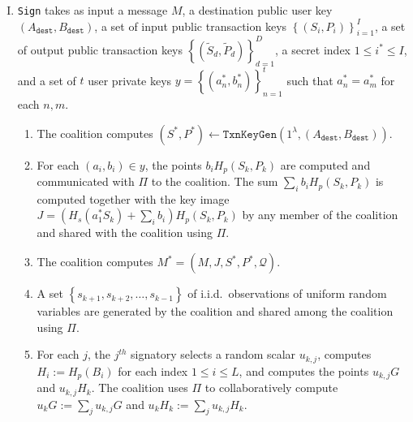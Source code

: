 \documentclass{mrl}
\theoremstyle{definition}
\begin{document}
\begin{enumerate}[(I)]

\item \texttt{Sign} takes as input a message $M$, a destination public user key $(A_{\texttt{dest}}, B_{\texttt{dest}})$, a set of input public transaction keys $\left\{(S_i, P_i)\right\}_{i=1}^{I}$, a set of output public transaction keys $\left\{(\widetilde{S}_d, \widetilde{P}_d)\right\}_{d=1}^{D}$, a secret index $1 \leq i^* \leq I$, and a set of $t$ user private keys $y=\left\{(a^*_n, b^*_n)\right\}_{n=1}^{t}$ such that $a^*_n = a^*_m$ for each $n,m$.
\begin{enumerate}[(1)]
\item The coalition computes $(S^*, P^*) \leftarrow \texttt{TxnKeyGen}(1^\lambda, (A_{\texttt{dest}}, B_{\texttt{dest}}))$.
\item For each $(a_i, b_i) \in y$, the points $b_i H_p(S_k, P_k)$ are computed and communicated with $\Pi$ to the coalition. The sum $\sum_i b_i H_p(S_k, P_k)$ is computed together with the key image $J = (H_s(a^*_1 S_k)+\sum_i b_i)H_p(S_k, P_k)$ by any member of the coalition and shared with the coalition using $\Pi$.
\item The coalition computes $M^* = (M, J, S^*, P^*, \mathcal{Q})$.
\item A set $\left\{s_{k+1}, s_{k+2}, \ldots, s_{k-1}\right\}$ of i.i.d.\ observations of uniform random variables are generated by the coalition and shared among the coalition using $\Pi$.

\item For each $j$, the $j^{th}$ signatory selects a random scalar $u_{k,j}$, computes $H_i:=H_{p}(B_i)$ for each index $1 \leq i \leq L$, and computes the points $u_{k,j}G$ and $u_{k,j}H_{k}$. The coalition uses $\Pi$ to collaboratively compute $u_{k}G := \sum_j u_{k,j} G$ and $u_k H_k:= \sum_j u_{k,j} H_{k}$.


\end{enumerate}
\end{enumerate}
\end{document}
